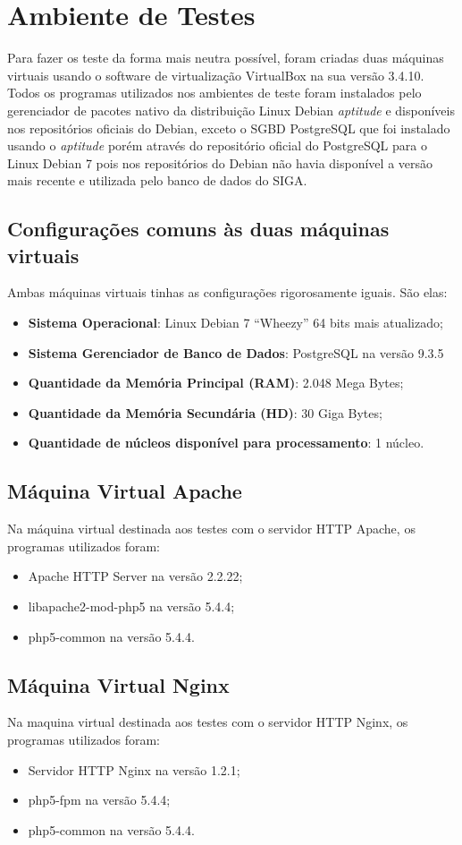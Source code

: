 \chapter{Ambiente de Testes}\label{cap:ambiente-de-testes}

Para fazer os teste da forma mais neutra possível, foram criadas duas máquinas virtuais usando o software de virtualização VirtualBox na sua versão 3.4.10.\\
Todos os programas utilizados nos ambientes de teste foram instalados pelo gerenciador de pacotes nativo da distribuição Linux Debian \textit{aptitude} e disponíveis nos repositórios oficiais do Debian, exceto o SGBD PostgreSQL que foi instalado usando o \textit{aptitude} porém através do repositório oficial do PostgreSQL para o Linux Debian 7 pois nos repositórios do Debian não havia disponível a versão mais recente e utilizada pelo banco de dados do SIGA.

\section{Configurações comuns às duas máquinas virtuais}
 Ambas máquinas virtuais tinhas as configurações rigorosamente iguais. São elas:
\begin{itemize}
\item \textbf{Sistema Operacional}: Linux Debian 7 “Wheezy” 64 bits mais atualizado;
\item \textbf{Sistema Gerenciador de Banco de Dados}: PostgreSQL na versão 9.3.5
\item \textbf{Quantidade da Memória Principal (RAM)}: 2.048 Mega Bytes;
\item \textbf{Quantidade da Memória Secundária (HD)}: 30 Giga Bytes;
\item \textbf{Quantidade de núcleos disponível para processamento}: 1 núcleo.
\end{itemize}

\section{Máquina Virtual Apache}
Na máquina virtual destinada aos testes com o servidor HTTP Apache, os programas utilizados foram:
\begin{itemize}
\item Apache HTTP Server na versão 2.2.22;
\item libapache2-mod-php5 na versão 5.4.4;
\item php5-common na versão 5.4.4.
\end{itemize}

\section{Máquina Virtual Nginx}
Na maquina virtual destinada aos testes com o servidor HTTP Nginx, os programas utilizados foram:

\begin{itemize}
\item Servidor HTTP Nginx na versão 1.2.1;
\item php5-fpm na versão 5.4.4;
\item php5-common na versão 5.4.4.
\end{itemize}

